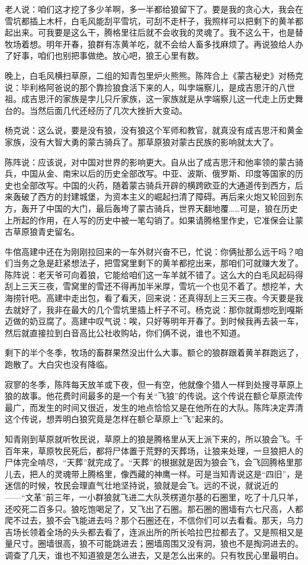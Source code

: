 \par 老人说：咱们这才挖了多少羊啊，多一半都给狼留下了。要是我的贪心大，我会在雪坑都插上木杆，白毛风能刮平雪坑，可刮不走杆子，我照样可以把剩下的黄羊都起出来。可我要是这么干，腾格里往后就不会收我的灵魂了。我不这么干，也是替牧场着想。明年开春，狼群有冻黄羊吃，就不会给人畜多找麻烦了。再说狼给人办了好事，咱们也别把事做绝。放心吧，狼王心里有数。
\par 晚上，白毛风横扫草原，二组的知青包里炉火熊熊。陈阵合上《蒙古秘史》对杨克说：毕利格阿爸说的那个靠捡狼食活下来的人，叫孛端察儿，是成吉思汗的八世祖。成吉思汗的家族是孛儿只斤家族，这一家族就是从孛端察儿这一代走上历史舞台的。当然后面几代还经历了几次大挫折大变动。
\par 杨克说：这么说，要是没有狼，没有狼这个军师和教官，就真没有成吉思汗和黄金家族，没有大智大勇的蒙古骑兵了。那草原狼对蒙古民族的影响就太大了。
\par 陈阵说：应该说，对中国对世界的影响更大。自从出了成吉思汗和他率领的蒙古骑兵，中国从金、南宋以后的历史全部改写。中亚、波斯、俄罗斯、印度等国家的历史也全部改写。中国的火药，随着蒙古骑兵开辟的横跨欧亚的大通道传到西方，后来轰破了西方的封建城堡，为资本主义的崛起扫清了障碍。再后来火炮又轮回到东方，轰开了中国的大门，最后轰垮了蒙古骑兵，世界天翻地覆……可是，狼在历史上所起的作用，在人写的历史中被一笔勾销了。如果请腾格里作史，它准保会让蒙古草原狼青史留名。
\par 牛倌高建中还在为刚刚拉回来的一车外财兴奋不已，忙说：你俩扯那么远干吗？咱们当务之急是赶紧想法子，把雪窝里剩下的黄羊都挖出来，那咱们可就赚大发了。陈阵说：老天爷可向着狼，它能给咱们这一车羊就不错了。这么大的白毛风起码得刮上三天三夜，雪窝里的雪还不得再加半米厚，雪坑一个也见不着了。想挖羊，大海捞针吧。高建中走出包，看了看天，回来说：还真得刮上三天三夜。今天要是我去就好了，我非在最大的几个雪坑里插上杆子不可。杨克说：那你就甭想吃到嘎斯迈做的奶豆腐了。高建中叹气说：唉，只好等明年开春了。到时候我再去装一车，然后就直接拉到白音高比公社收购站，你们俩不说，谁也不知道。
\par 剩下的半个冬季，牧场的畜群果然没出什么大事。额仑的狼群跟着黄羊群跑远了，跑散了。大白灾也没有降临。
\par 
\par 寂寥的冬季，陈阵每天放羊或下夜，但一有空，他就像个猎人一样到处搜寻草原上狼的故事。他花费时间最多的是一个有关“飞狼”的传说。这个传说在额仑草原流传最广，而发生的时间又很近，发生的地点恰恰又是在他所在的大队。陈阵决定弄清这个传说，想弄明白狼究竟是怎样在额仑草原上“飞”起来的。
\par 知青刚到草原就听牧民说，草原上的狼是腾格里从天上派下来的，所以狼会飞。千百年来，草原牧民死后，都将尸体置于荒野的天葬场，让狼来处理，一旦狼把人的尸体完全啃尽，“天葬”就完成了。“天葬”的根据就是因为狼会飞，会飞回腾格里那儿去，把人的灵魂带上腾格里，像西藏的神鹰一样。可是当知青说这是“四旧”，是迷信的时候，牧民会理直气壮地坚持说，狼就是会飞。远的不说，就说近的——“文革”前三年，一小群狼就飞进二大队茨楞道尔基的石圈里，吃了十几只羊，还咬死二百多只。狼吃饱喝足了，又飞出了石圈。那石圈的圈墙有六七尺高，人都爬不过去，狼不会飞能进去吗？那个石圈还在，不信你们可以去看看。那天，乌力吉场长领着全场的头头都去看了，连派出所的所长哈拉巴拉都去了。又是照相又是量尺寸。圈墙很高，狼不可能跳进去；圈墙周围又没有洞，狼也不是掏洞进去的。调查了几天，谁也不知道狼是怎么进去，又是怎么出来的。只有牧民心里最明白。
